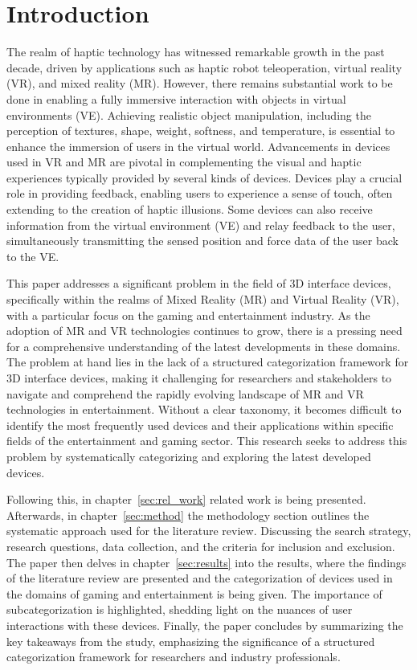 \section{Introduction}
\label{intro}

The realm of haptic technology has witnessed remarkable growth in the past decade, driven by applications such as haptic robot teleoperation, virtual reality (VR), and mixed reality (MR). However, there remains substantial work to be done in enabling a fully immersive interaction with objects in virtual environments (VE). Achieving realistic object manipulation, including the perception of textures, shape, weight, softness, and temperature, is essential to enhance the immersion of users in the virtual world. Advancements in devices used in VR and MR are pivotal in complementing the visual and haptic experiences typically provided by several kinds of devices. Devices play a crucial role in providing feedback, enabling users to experience a sense of touch, often extending to the creation of haptic illusions. Some devices can also receive information from the virtual environment (VE) and relay feedback to the user, simultaneously transmitting the sensed position and force data of the user back to the VE.

This paper addresses a significant problem in the field of 3D interface devices, specifically within the realms of Mixed Reality (MR) and Virtual Reality (VR), with a particular focus on the gaming and entertainment industry. As the adoption of MR and VR technologies continues to grow, there is a pressing need for a comprehensive understanding of the latest developments in these domains. The problem at hand lies in the lack of a structured categorization framework for 3D interface devices, making it challenging for researchers and stakeholders to navigate and comprehend the rapidly evolving landscape of MR and VR technologies in entertainment. Without a clear taxonomy, it becomes difficult to identify the most frequently used devices and their applications within specific fields of the entertainment and gaming sector. This research seeks to address this problem by systematically categorizing and exploring the latest developed devices.

Following this, in chapter~\ref{sec:rel_work} related work is being presented. Afterwards, in chapter~\ref{sec:method} the methodology section outlines the systematic approach used for the literature review. Discussing the search strategy, research questions, data collection, and the criteria for inclusion and exclusion. The paper then delves in chapter~\ref{sec:results} into the results, where the findings of the literature review are presented and the categorization of devices used in the domains of gaming and entertainment is being given. The importance of subcategorization is highlighted, shedding light on the nuances of user interactions with these devices. Finally, the paper concludes by summarizing the key takeaways from the study, emphasizing the significance of a structured categorization framework for researchers and industry professionals.
